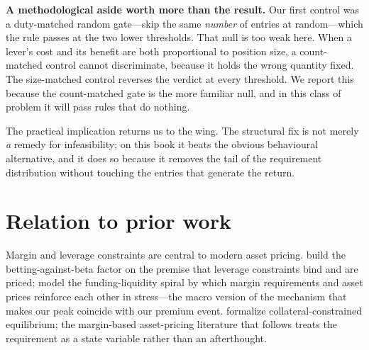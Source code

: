 \documentclass[11pt]{article}
\begin{document}
\textbf{A methodological aside worth more than the result.} Our first control was a
duty-matched random gate---skip the same \emph{number} of entries at random---which the rule
passes at the two lower thresholds. That null is too weak here. When a lever's cost and its
benefit are both proportional to position size, a count-matched control cannot discriminate,
because it holds the wrong quantity fixed. The size-matched control reverses the verdict at
every threshold. We report this because the count-matched gate is the more familiar null, and
in this class of problem it will pass rules that do nothing.

The practical implication returns us to the wing. The structural fix is not merely \emph{a}
remedy for infeasibility; on this book it beats the obvious behavioural alternative, and it
does so because it removes the tail of the requirement distribution without touching the
entries that generate the return.

\section{Relation to prior work}
Margin and leverage constraints are central to modern asset pricing. \citet{fp} build the
betting-against-beta factor on the premise that leverage constraints bind and are priced;
\citet{bp} model the funding-liquidity spiral by which margin requirements and asset prices
reinforce each other in stress---the macro version of the mechanism that makes our peak
coincide with our premium event. \citet{gk} formalize collateral-constrained equilibrium; the
margin-based asset-pricing literature that follows treats the requirement as a state variable
rather than an afterthought.
\end{document}
